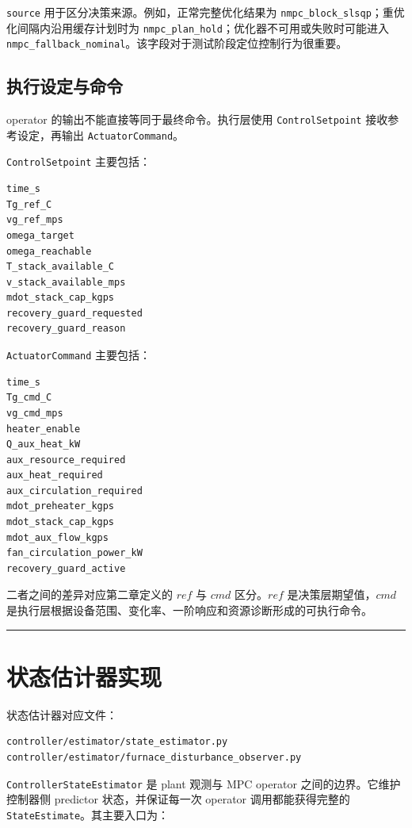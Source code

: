 \documentclass[UTF8,openany,zihao=-4,oneside]{ctexbook}
\providecommand{\passthrough}[1]{#1}
\newcommand{\manualdivider}{\par\vspace{0.6em}\noindent\textcolor{FGLine}{\rule{\linewidth}{0.7pt}}\vspace{0.6em}\par}
\begin{document}
\passthrough{\lstinline!source!} 用于区分决策来源。例如，正常完整优化结果为 \passthrough{\lstinline!nmpc_block_slsqp!}；重优化间隔内沿用缓存计划时为 \passthrough{\lstinline!nmpc_plan_hold!}；优化器不可用或失败时可能进入 \passthrough{\lstinline!nmpc_fallback_nominal!}。该字段对于测试阶段定位控制行为很重要。

\subsection{执行设定与命令}\label{subsec:setpoint-command}

operator 的输出不能直接等同于最终命令。执行层使用 \passthrough{\lstinline!ControlSetpoint!} 接收参考设定，再输出 \passthrough{\lstinline!ActuatorCommand!}。

\passthrough{\lstinline!ControlSetpoint!} 主要包括：

\begin{lstlisting}
time_s
Tg_ref_C
vg_ref_mps
omega_target
omega_reachable
T_stack_available_C
v_stack_available_mps
mdot_stack_cap_kgps
recovery_guard_requested
recovery_guard_reason
\end{lstlisting}

\passthrough{\lstinline!ActuatorCommand!} 主要包括：

\begin{lstlisting}
time_s
Tg_cmd_C
vg_cmd_mps
heater_enable
Q_aux_heat_kW
aux_resource_required
aux_heat_required
aux_circulation_required
mdot_preheater_kgps
mdot_stack_cap_kgps
mdot_aux_flow_kgps
fan_circulation_power_kW
recovery_guard_active
\end{lstlisting}

二者之间的差异对应第二章定义的 \(ref\) 与 \(cmd\) 区分。\(ref\) 是决策层期望值，\(cmd\) 是执行层根据设备范围、变化率、一阶响应和资源诊断形成的可执行命令。

\manualdivider

\section{状态估计器实现}\label{sec:state-estimator-implementation}

状态估计器对应文件：

\begin{lstlisting}
controller/estimator/state_estimator.py
controller/estimator/furnace_disturbance_observer.py
\end{lstlisting}

\passthrough{\lstinline!ControllerStateEstimator!} 是 plant 观测与 MPC operator 之间的边界。它维护控制器侧 predictor 状态，并保证每一次 operator 调用都能获得完整的 \passthrough{\lstinline!StateEstimate!}。其主要入口为：
\end{document}
